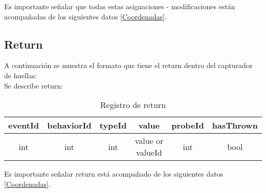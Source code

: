 \documentclass[10pt,a4paper]{article}
\begin{document}
Es importante señalar que todas estas asignaciones - modificaciones están acompañadas de los siguientes datos \ref{Coordenadas}.

\newpage
\subsection{Return}

A continuación se muestra el formato que tiene el return dentro del capturador de huellas:\\

Se describe return:\\

\begin{table}[!h]
\begin{center}
\begin{tabular}{| c | c | c | c | c | c |}
\hline
eventId & behaviorId & typeId & value & probeId & hasThrown \\
\hline
int & int & int & value or valueId\footnotemark[1] & int & bool\\
\hline
\end{tabular}
\caption{Registro de return} 
\end{center}
\end{table}

Es importante señalar return está acompañado de los siguientes datos \ref{Coordenadas}.

\end{document}

